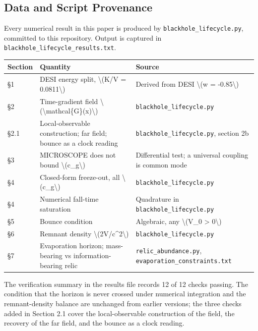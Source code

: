 \documentclass[
  10pt,
]{article}
\begin{document}
\hypertarget{data-and-script-provenance}{%
\subsection{Data and Script
Provenance}\label{data-and-script-provenance}}

Every numerical result in this paper is produced by
\texttt{blackhole\_lifecycle.py}, committed to this repository. Output
is captured in \texttt{blackhole\_lifecycle\_results.txt}.

\begin{longtable}[]{@{}lll@{}}
\toprule\noalign{}
Section & Quantity & Source \\
\midrule\noalign{}
\endhead
\bottomrule\noalign{}
\endlastfoot
§1 & DESI energy split, \textbackslash(K/V = 0.0811\textbackslash) &
Derived from DESI \textbackslash(w = -0.85\textbackslash) \\
§2 & Time-gradient field
\textbackslash(\textbackslash mathcal\{G\}(x)\textbackslash) &
\texttt{blackhole\_lifecycle.py} \\
§2.1 & Local-observable construction; far field; bounce as a clock
reading & \texttt{blackhole\_lifecycle.py}, section 2b \\
§3 & MICROSCOPE does not bound \textbackslash(c\_g\textbackslash) &
Differential test; a universal coupling is common mode \\
§4 & Closed-form freeze-out, all \textbackslash(c\_g\textbackslash) &
\texttt{blackhole\_lifecycle.py} \\
§4 & Numerical fall-time saturation & Quadrature in
\texttt{blackhole\_lifecycle.py} \\
§5 & Bounce condition & Algebraic, any \textbackslash(V\_0
\textgreater{} 0\textbackslash) \\
§6 & Remnant density \textbackslash(2V/c\^{}2\textbackslash) &
\texttt{blackhole\_lifecycle.py} \\
§7 & Evaporation horizon; mass-bearing vs information-bearing relic &
\texttt{relic\_abundance.py}, \texttt{evaporation\_constraints.txt} \\
\end{longtable}

The verification summary in the results file records 12 of 12 checks
passing. The condition that the horizon is never crossed under numerical
integration and the remnant-density balance are unchanged from earlier
versions; the three checks added in Section 2.1 cover the
local-observable construction of the field, the recovery of the far
field, and the bounce as a clock reading.
\end{document}
